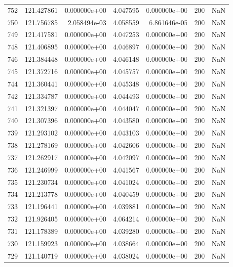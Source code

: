 \begin{tabular}{rrrrrrr}
 752 & 121.427861 &  0.000000e+00 &  4.047595 &  0.000000e+00 &         200 & NaN \\
 750 & 121.756785 &  2.058494e-03 &  4.058559 &  6.861646e-05 &         200 & NaN \\
 749 & 121.417581 &  0.000000e+00 &  4.047253 &  0.000000e+00 &         200 & NaN \\
 748 & 121.406895 &  0.000000e+00 &  4.046897 &  0.000000e+00 &         200 & NaN \\
 746 & 121.384448 &  0.000000e+00 &  4.046148 &  0.000000e+00 &         200 & NaN \\
 745 & 121.372716 &  0.000000e+00 &  4.045757 &  0.000000e+00 &         200 & NaN \\
 744 & 121.360441 &  0.000000e+00 &  4.045348 &  0.000000e+00 &         200 & NaN \\
 742 & 121.334787 &  0.000000e+00 &  4.044493 &  0.000000e+00 &         200 & NaN \\
 741 & 121.321397 &  0.000000e+00 &  4.044047 &  0.000000e+00 &         200 & NaN \\
 740 & 121.307396 &  0.000000e+00 &  4.043580 &  0.000000e+00 &         200 & NaN \\
 739 & 121.293102 &  0.000000e+00 &  4.043103 &  0.000000e+00 &         200 & NaN \\
 738 & 121.278169 &  0.000000e+00 &  4.042606 &  0.000000e+00 &         200 & NaN \\
 737 & 121.262917 &  0.000000e+00 &  4.042097 &  0.000000e+00 &         200 & NaN \\
 736 & 121.246999 &  0.000000e+00 &  4.041567 &  0.000000e+00 &         200 & NaN \\
 735 & 121.230734 &  0.000000e+00 &  4.041024 &  0.000000e+00 &         200 & NaN \\
 734 & 121.213778 &  0.000000e+00 &  4.040459 &  0.000000e+00 &         200 & NaN \\
 733 & 121.196441 &  0.000000e+00 &  4.039881 &  0.000000e+00 &         200 & NaN \\
 732 & 121.926405 &  0.000000e+00 &  4.064214 &  0.000000e+00 &         200 & NaN \\
 731 & 121.178389 &  0.000000e+00 &  4.039280 &  0.000000e+00 &         200 & NaN \\
 730 & 121.159923 &  0.000000e+00 &  4.038664 &  0.000000e+00 &         200 & NaN \\
 729 & 121.140719 &  0.000000e+00 &  4.038024 &  0.000000e+00 &         200 & NaN \\

\end{tabular}
